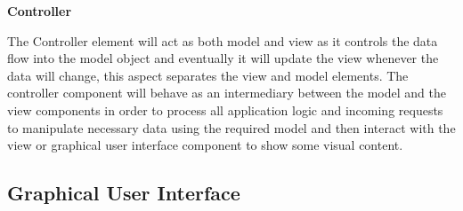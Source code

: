 \noindent
\textbf{Controller}
\newline

The Controller element will act as both model and view as it controls the data flow into
the model object and eventually it will update the view whenever the data will change, this
aspect separates the view and model elements. The controller component will behave as an
intermediary between the model and the view components in order to process all application
logic and incoming requests to manipulate necessary data using the required model and then
interact with the view or graphical user interface component to show some visual content.

\newpage

\subsection{Graphical User Interface}

